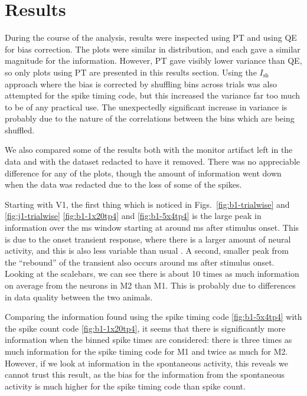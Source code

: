 \section{Results}

During the course of the analysis, results were inspected using \ac{PT} and using \ac{QE} for bias correction. The plots were similar in distribution, and each gave a similar magnitude for the information. However, \ac{PT} gave visibly lower variance than \ac{QE}, so only plots using \ac{PT} are presented in this results section.
Using the $I_{\text{sh}}$ approach where the bias is corrected by shuffling bins across trials \cite{Montemurro2007} was also attempted for the spike timing code, but this increased the variance far too much to be of any practical use. The unexpectedly significant increase in variance is probably due to the nature of the correlations between the bins which are being shuffled.

We also compared some of the results both with the monitor artifact left in the data and with the dataset redacted to have it removed. There was no appreciable difference for any of the plots, though the amount of information went down when the data was redacted due to the loss of some of the spikes.


Starting with \ac{V1}, the first thing which is noticed in Figs.~\ref{fig:b1-trialwise} and \ref{fig:j1-trialwise} \ref{fig:b1-1x20tp4} and \ref{fig:b1-5x4tp4} is the large peak in information over the \unit[20]{ms} window starting at around \unit[40]{ms} after stimulus onset. This is due to the onset transient response, where there is a larger amount of neural activity, and this is also less variable than usual \cite{Muller2001}. A second, smaller peak from the ``rebound'' of the transient also occurs around \unit[100]{ms} after stimulus onset. Looking at the scalebars, we can see there is about 10 times as much information on average from the neurons in \ac{M2} than \ac{M1}. This is probably due to differences in data quality between the two animals.

Comparing the information found using the spike timing code \ref{fig:b1-5x4tp4} with the spike count code \ref{fig:b1-1x20tp4}, it seems that there is significantly more information when the binned spike times are considered: there is three times as much information for the spike timing code for \ac{M1} and twice as much for \ac{M2}. However, if we look at information in the spontaneous activity, this reveals we cannot trust this result, as the bias for the information from the spontaneous activity is much higher for the spike timing code than spike count.


